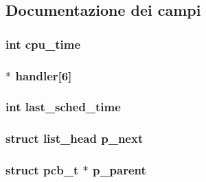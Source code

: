 \subsection{Documentazione dei campi}
\hypertarget{structpcb__t_a7438f6e4370c77335272481935c3c2da}{
\subsubsection[{cpu\-\_\-time}]{\setlength{\rightskip}{0pt plus 5cm}int cpu\-\_\-time}}\label{structpcb__t_a7438f6e4370c77335272481935c3c2da}
\hypertarget{structpcb__t_aafb68b6d949df584f04372a411587a3e}{
\subsubsection[{handler}]{$\ast$ handler\mbox{[}6\mbox{]}}}\label{structpcb__t_aafb68b6d949df584f04372a411587a3e}
\hypertarget{structpcb__t_aab19ac996ae189b600c68cb4e4e8b66b}{
\subsubsection[{last\-\_\-sched\-\_\-time}]{\setlength{\rightskip}{0pt plus 5cm}int last\-\_\-sched\-\_\-time}}\label{structpcb__t_aab19ac996ae189b600c68cb4e4e8b66b}
\hypertarget{structpcb__t_adb25d84c36e53123e815e122610fd3ab}{
\subsubsection[{p\-\_\-next}]{\setlength{\rightskip}{0pt plus 5cm}struct {\bf list\-\_\-head} p\-\_\-next}}\label{structpcb__t_adb25d84c36e53123e815e122610fd3ab}
\hypertarget{structpcb__t_a9e790d449812df0e71df251bb744648a}{
\subsubsection[{p\-\_\-parent}]{\setlength{\rightskip}{0pt plus 5cm}struct {\bf pcb\-\_\-t} $\ast$ p\-\_\-parent}}\label{structpcb__t_a9e790d449812df0e71df251bb744648a}
